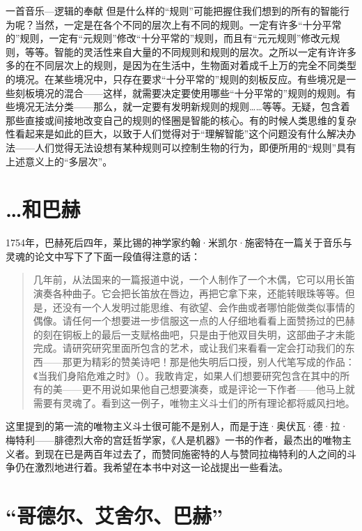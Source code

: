 \begin{intro}{一首音乐—逻辑的奉献}
但是什么样的“规则”可能把握住我们想到的所有的智能行为呢？当然，一定是在各个不同的层次上有不同的规则。一定有许多“十分平常的”规则，一定有“元规则”修改“十分平常的”规则，而且有“元元规则”修改元规则，等等。智能的灵活性来自大量的不同规则和规则的层次。之所以一定有许许多多的在不同层次上的规则，是因为在生活中，生物面对着成千上万的完全不同类型的境况。在某些境况中，只存在要求“十分平常的”规则的刻板反应。有些境况是一些刻板境况的混合——这样，就需要决定要使用哪些“十分平常的”规则的规则。有些境况无法分类——那么，就一定要有发明新规则的规则……等等。无疑，包含着那些直接或间接地改变自己的规则的怪圈是智能的核心。有的时候人类思维的复杂性看起来是如此的巨大，以致于人们觉得对于“理解智能”这个问题没有什么解决办法——人们觉得无法设想有某种规则可以控制生物的行为，即便所用的“规则”具有上述意义上的“多层次”。

\section{…和巴赫}

1754年，巴赫死后四年，莱比锡的神学家约翰·米凯尔·施密特在一篇关于音乐与灵魂的论文中写下了下面一段值得注意的话：

\begin{quote}
几年前，从法国来的一篇报道中说，一个人制作了一个木偶，它可以用长笛演奏各种曲子。它会把长笛放在唇边，再把它拿下来，还能转眼珠等等。但是，还没有一个人发明过能思维、有欲望、会作曲或者哪怕能做类似事情的偶像。请任何一个想要进一步信服这一点的人仔细地看看上面赞扬过的巴赫的刻在铜板上的最后一支赋格曲吧，只是由于他双目失明，这部曲子才未能完成。请研究研究里面所包含的艺术，或让我们来看看一定会打动我们的东西——那更为精彩的赞美诗吧！那是他失明后口授，别人代笔写成的作品：《当我们身陷危难之时》（）。我敢肯定，如果人们想要研究包含在其中的所有的美——更不用说如果他自己想要演奏，或是评论一下作者——他马上就需要有灵魂了。看到这一例子，唯物主义斗士们的所有理论都将威风扫地。
\end{quote}

这里提到的第一流的唯物主义斗士很可能不是别人，而是于连·奥伏瓦·德·拉·梅特利——腓德烈大帝的宫廷哲学家，《人是机器》一书的作者，最杰出的唯物主义者。到现在已是两百年过去了，而赞同施密特的人与赞同拉梅特利的人之间的斗争仍在激烈地进行着。我希望在本书中对这一论战提出一些看法。

\section{“哥德尔、艾舍尔、巴赫”}


\end{intro}

